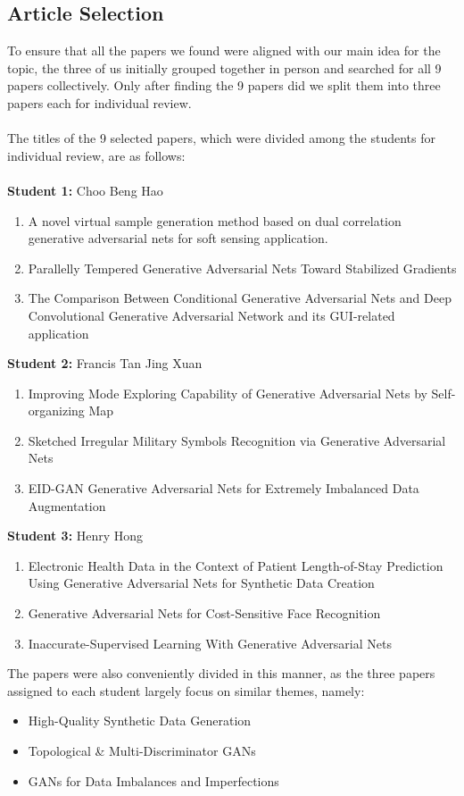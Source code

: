 \documentclass[12pt,a4paper]{article}
\begin{document}



\subsection{Article Selection}
To ensure that all the papers we found were aligned with our main idea for the topic, the three of us initially grouped together in person and searched for all 9 papers collectively. Only after finding the 9 papers did we split them into three papers each for individual review. \\
\\ The titles of the 9 selected papers, which were divided among the students for individual review, are as follows: \\
\\ \textbf{Student 1:} Choo Beng Hao
\begin{enumerate}
    \item A novel virtual sample generation method based on dual correlation generative adversarial nets for soft sensing application.
    \item Parallelly Tempered Generative Adversarial Nets Toward Stabilized Gradients
    \item The Comparison Between Conditional Generative Adversarial Nets and Deep Convolutional Generative Adversarial Network and its GUI-related application
\end{enumerate}
\textbf{Student 2:} Francis Tan Jing Xuan
\begin{enumerate}
    \item Improving Mode Exploring Capability of Generative Adversarial Nets by Self-organizing Map
    \item Sketched Irregular Military Symbols Recognition via Generative Adversarial Nets
    \item EID-GAN Generative Adversarial Nets for Extremely Imbalanced Data Augmentation
\end{enumerate}
\textbf{Student 3:} Henry Hong
\begin{enumerate}
    \item Electronic Health Data in the Context of Patient Length-of-Stay Prediction Using Generative Adversarial Nets for Synthetic Data Creation
    \item Generative Adversarial Nets for Cost-Sensitive Face Recognition
    \item Inaccurate-Supervised Learning With Generative Adversarial Nets
\end{enumerate}
The papers were also conveniently divided in this manner, as the three papers assigned to each student largely focus on similar themes, namely:
\begin{itemize}
    \item High-Quality Synthetic Data Generation
    \item Topological \& Multi-Discriminator GANs
    \item GANs for Data Imbalances and Imperfections
\end{itemize}
\end{document}
